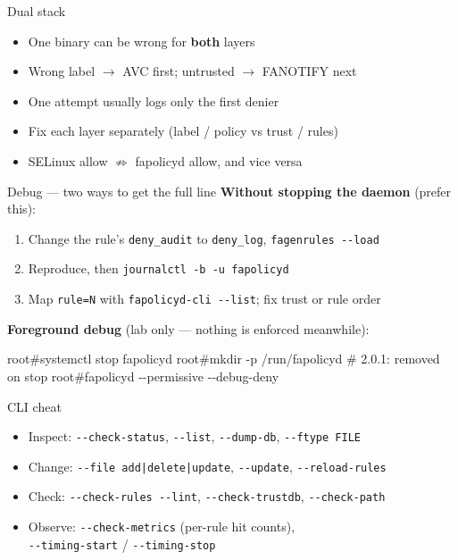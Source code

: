 \documentclass[aspectratio=169,11pt]{beamer}
\newcommand{\rootp}{\textcolor{rootc}{root\#}}
\newcommand{\dd}{-{}-}
\begin{document}
\begin{frame}{Dual stack}
  \begin{itemize}
    \item One binary can be wrong for \textbf{both} layers
    \item Wrong label $\rightarrow$ AVC first; untrusted $\rightarrow$ FANOTIFY next
    \item One attempt usually logs only the first denier
    \item Fix each layer separately (label / policy vs trust / rules)
    \item SELinux allow $\not\Rightarrow$ fapolicyd allow, and vice versa
  \end{itemize}
\end{frame}

\begin{frame}[fragile]{Debug --- two ways to get the full line}
  \textbf{Without stopping the daemon} (prefer this):
  \begin{enumerate}
    \item Change the rule's \texttt{deny\_audit} to \texttt{deny\_log}, \texttt{fagenrules \dd load}
    \item Reproduce, then \texttt{journalctl -b -u fapolicyd}
    \item Map \texttt{rule=N} with \texttt{fapolicyd-cli \dd list}; fix trust or rule order
  \end{enumerate}
  \textbf{Foreground debug} (lab only --- nothing is enforced meanwhile):
  \begin{semiverbatim}
\rootp systemctl stop fapolicyd
\rootp mkdir -p /run/fapolicyd      # 2.0.1: removed on stop
\rootp fapolicyd \dd{}permissive \dd{}debug-deny
  \end{semiverbatim}
\end{frame}

\begin{frame}{CLI cheat}
  \begin{itemize}
    \item Inspect: \texttt{\dd check-status}, \texttt{\dd list},
          \texttt{\dd dump-db}, \texttt{\dd ftype FILE}
    \item Change: \texttt{\dd file add|delete|update}, \texttt{\dd update},
          \texttt{\dd reload-rules}
    \item Check: \texttt{\dd check-rules \dd lint}, \texttt{\dd check-trustdb},
          \texttt{\dd check-path}
    \item Observe: \texttt{\dd check-metrics} (per-rule hit counts),\\
          \texttt{\dd timing-start} / \texttt{\dd timing-stop}
  \end{itemize}
\end{frame}
\end{document}
